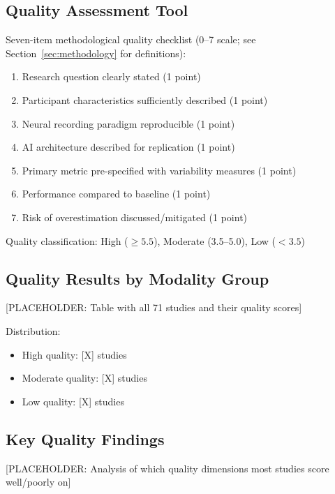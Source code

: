 
\subsection{Quality Assessment Tool}

Seven-item methodological quality checklist (0--7 scale; see Section~\ref{sec:methodology} for definitions):

\begin{enumerate}
    \item Research question clearly stated (1 point)
    \item Participant characteristics sufficiently described (1 point)
    \item Neural recording paradigm reproducible (1 point)
    \item AI architecture described for replication (1 point)
    \item Primary metric pre-specified with variability measures (1 point)
    \item Performance compared to baseline (1 point)
    \item Risk of overestimation discussed/mitigated (1 point)
\end{enumerate}

Quality classification: High ($\geq 5.5$), Moderate (3.5--5.0), Low ($<3.5$)

\subsection{Quality Results by Modality Group}

[PLACEHOLDER: Table with all 71 studies and their quality scores]

Distribution:
\begin{itemize}
    \item High quality: [X] studies
    \item Moderate quality: [X] studies
    \item Low quality: [X] studies
\end{itemize}

\subsection{Key Quality Findings}

[PLACEHOLDER: Analysis of which quality dimensions most studies score well/poorly on]

